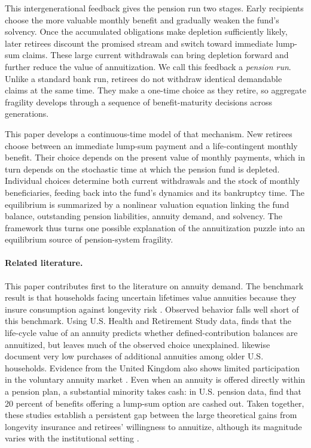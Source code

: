 \documentclass[a4paper, 12pt]{article}
\begin{document}
This intergenerational feedback gives the pension run two stages. Early
recipients choose the more valuable monthly benefit and gradually weaken the
fund's solvency. Once the accumulated obligations make depletion sufficiently
likely, later retirees discount the promised stream and switch toward immediate
lump-sum claims. These large current withdrawals can bring depletion forward and
further reduce the value of annuitization. We call this feedback a \emph{pension
run}. Unlike a standard bank run, retirees do not withdraw identical demandable
claims at the same time. They make a one-time choice as they retire, so aggregate
fragility develops through a sequence of benefit-maturity decisions across
generations.

This paper develops a continuous-time model of that mechanism. New retirees
choose between an immediate lump-sum payment and a life-contingent monthly
benefit. Their choice depends on the present value of monthly payments, which in
turn depends on the stochastic time at which the pension fund is depleted.
Individual choices determine both current withdrawals and the stock of monthly
beneficiaries, feeding back into the fund's dynamics and its bankruptcy time.
The equilibrium is summarized by a nonlinear valuation equation linking the
fund balance, outstanding pension liabilities, annuity demand, and solvency.
The framework thus turns one possible explanation of the annuitization puzzle
into an equilibrium source of pension-system fragility.

\paragraph{Related literature.}
This paper contributes first to the literature on annuity demand. The benchmark
result is that households facing uncertain lifetimes value annuities because
they insure consumption against longevity risk \citep{yaari1965,davidoff2005}.
Observed behavior falls well short of this benchmark. Using U.S. Health and
Retirement Study data, \citet{brown2001} finds that the life-cycle value of an
annuity predicts whether defined-contribution balances are annuitized, but leaves
much of the observed choice unexplained. \citet{dushi2004} likewise document very
low purchases of additional annuities among older U.S. households. Evidence from
the United Kingdom also shows limited participation in the voluntary annuity
market \citep{inkmann2011}. Even when an annuity is offered directly within a
pension plan, a substantial minority takes cash: in U.S. pension data,
\citet{hurd2006} find that 20 percent of benefits offering a lump-sum option are
cashed out. Taken together, these studies establish a persistent gap between the
large theoretical gains from longevity insurance and retirees' willingness to
annuitize, although its magnitude varies with the institutional setting
\citep{benartzi2011}.
\end{document}
